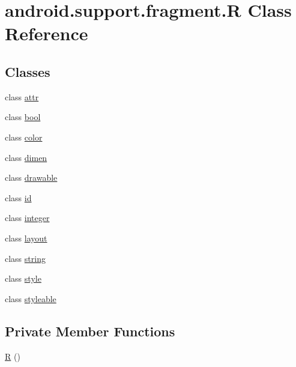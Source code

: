 \hypertarget{classandroid_1_1support_1_1fragment_1_1_r}{}\section{android.\+support.\+fragment.\+R Class Reference}
\label{classandroid_1_1support_1_1fragment_1_1_r}
\subsection*{Classes}
\begin{DoxyCompactItemize}
\item 
class \mbox{\hyperlink{classandroid_1_1support_1_1fragment_1_1_r_1_1attr}{attr}}
\item 
class \mbox{\hyperlink{classandroid_1_1support_1_1fragment_1_1_r_1_1bool}{bool}}
\item 
class \mbox{\hyperlink{classandroid_1_1support_1_1fragment_1_1_r_1_1color}{color}}
\item 
class \mbox{\hyperlink{classandroid_1_1support_1_1fragment_1_1_r_1_1dimen}{dimen}}
\item 
class \mbox{\hyperlink{classandroid_1_1support_1_1fragment_1_1_r_1_1drawable}{drawable}}
\item 
class \mbox{\hyperlink{classandroid_1_1support_1_1fragment_1_1_r_1_1id}{id}}
\item 
class \mbox{\hyperlink{classandroid_1_1support_1_1fragment_1_1_r_1_1integer}{integer}}
\item 
class \mbox{\hyperlink{classandroid_1_1support_1_1fragment_1_1_r_1_1layout}{layout}}
\item 
class \mbox{\hyperlink{classandroid_1_1support_1_1fragment_1_1_r_1_1string}{string}}
\item 
class \mbox{\hyperlink{classandroid_1_1support_1_1fragment_1_1_r_1_1style}{style}}
\item 
class \mbox{\hyperlink{classandroid_1_1support_1_1fragment_1_1_r_1_1styleable}{styleable}}
\end{DoxyCompactItemize}
\subsection*{Private Member Functions}
\begin{DoxyCompactItemize}
\item 
\mbox{\hyperlink{classandroid_1_1support_1_1fragment_1_1_r_ac2098583343558d9dd2ab4c9147159d9}{R}} ()
\end{DoxyCompactItemize}


